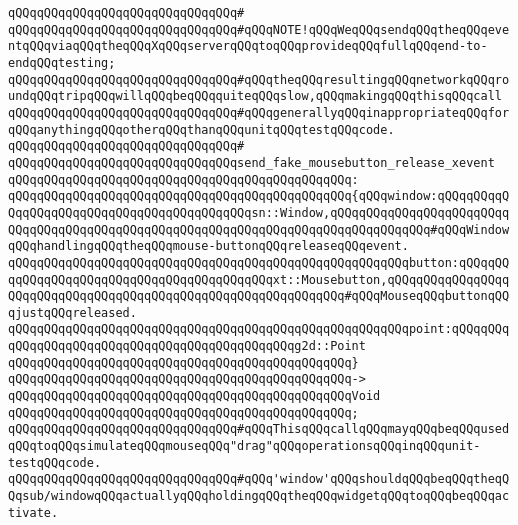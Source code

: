 \verb|qQQqqQQqqQQqqQQqqQQqqQQqqQQqqQQq#|\newline
\verb|qQQqqQQqqQQqqQQqqQQqqQQqqQQqqQQq#qQQqNOTE!qQQqWeqQQqsendqQQqtheqQQqeventqQQqviaqQQqtheqQQqXqQQqserverqQQqtoqQQqprovideqQQqfullqQQqend-to-endqQQqtesting;|\newline
\verb|qQQqqQQqqQQqqQQqqQQqqQQqqQQqqQQq#qQQqtheqQQqresultingqQQqnetworkqQQqroundqQQqtripqQQqwillqQQqbeqQQqquiteqQQqslow,qQQqmakingqQQqthisqQQqcall|\newline
\verb|qQQqqQQqqQQqqQQqqQQqqQQqqQQqqQQq#qQQqgenerallyqQQqinappropriateqQQqforqQQqanythingqQQqotherqQQqthanqQQqunitqQQqtestqQQqcode.|\newline
\verb|qQQqqQQqqQQqqQQqqQQqqQQqqQQqqQQq#|\newline
\verb|qQQqqQQqqQQqqQQqqQQqqQQqqQQqqQQqsend_fake_mousebutton_release_xevent|\newline
\verb|qQQqqQQqqQQqqQQqqQQqqQQqqQQqqQQqqQQqqQQqqQQqqQQq:|\newline
\verb|qQQqqQQqqQQqqQQqqQQqqQQqqQQqqQQqqQQqqQQqqQQqqQQq{qQQqwindow:qQQqqQQqqQQqqQQqqQQqqQQqqQQqqQQqqQQqqQQqqQQqsn::Window,qQQqqQQqqQQqqQQqqQQqqQQqqQQqqQQqqQQqqQQqqQQqqQQqqQQqqQQqqQQqqQQqqQQqqQQqqQQqqQQqqQQq#qQQqWindowqQQqhandlingqQQqtheqQQqmouse-buttonqQQqreleaseqQQqevent.|\newline
\verb|qQQqqQQqqQQqqQQqqQQqqQQqqQQqqQQqqQQqqQQqqQQqqQQqqQQqqQQqbutton:qQQqqQQqqQQqqQQqqQQqqQQqqQQqqQQqqQQqqQQqqQQqxt::Mousebutton,qQQqqQQqqQQqqQQqqQQqqQQqqQQqqQQqqQQqqQQqqQQqqQQqqQQqqQQqqQQqqQQq#qQQqMouseqQQqbuttonqQQqjustqQQqreleased.|\newline
\verb|qQQqqQQqqQQqqQQqqQQqqQQqqQQqqQQqqQQqqQQqqQQqqQQqqQQqqQQqpoint:qQQqqQQqqQQqqQQqqQQqqQQqqQQqqQQqqQQqqQQqqQQqqQQqg2d::Point|\newline
\verb|qQQqqQQqqQQqqQQqqQQqqQQqqQQqqQQqqQQqqQQqqQQqqQQq}|\newline
\verb|qQQqqQQqqQQqqQQqqQQqqQQqqQQqqQQqqQQqqQQqqQQqqQQq->|\newline
\verb|qQQqqQQqqQQqqQQqqQQqqQQqqQQqqQQqqQQqqQQqqQQqqQQqVoid|\newline
\verb|qQQqqQQqqQQqqQQqqQQqqQQqqQQqqQQqqQQqqQQqqQQqqQQq;|\newline
\newline
\verb|qQQqqQQqqQQqqQQqqQQqqQQqqQQqqQQq#qQQqThisqQQqcallqQQqmayqQQqbeqQQqusedqQQqtoqQQqsimulateqQQqmouseqQQq"drag"qQQqoperationsqQQqinqQQqunit-testqQQqcode.|\newline
\verb|qQQqqQQqqQQqqQQqqQQqqQQqqQQqqQQq#qQQq'window'qQQqshouldqQQqbeqQQqtheqQQqsub/windowqQQqactuallyqQQqholdingqQQqtheqQQqwidgetqQQqtoqQQqbeqQQqactivate.|\newline
